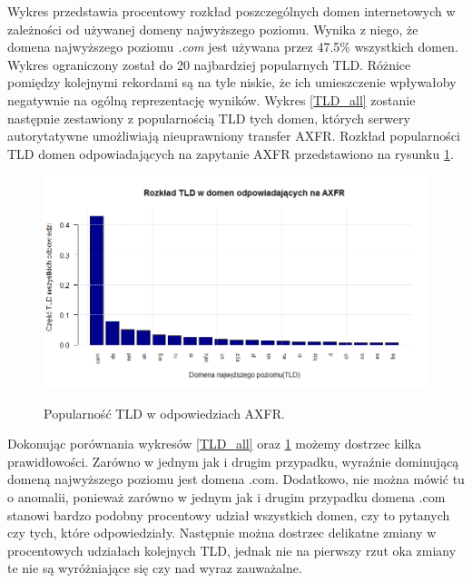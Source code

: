 Wykres przedstawia procentowy rozkład poszczególnych domen internetowych w zależności od używanej domeny najwyższego poziomu. Wynika z niego, że domena najwyższego poziomu \textit{.com} jest używana przez 47.5\% wszystkich domen. Wykres ograniczony został do 20 najbardziej popularnych TLD. Różnice pomiędzy kolejnymi rekordami są na tyle niskie, że ich umieszczenie wpływałoby negatywnie na ogólną reprezentację wyników. Wykres \ref{TLD_all} zostanie następnie zestawiony z popularnością TLD tych domen, których serwery autorytatywne umożliwiają nieuprawniony transfer AXFR. Rozkład popularności TLD domen odpowiadających na zapytanie AXFR przedstawiono na rysunku \ref{resp}.
\begin{center}
	\begin{figure}
		\includegraphics[width=1.0\textwidth]{image/resp}\label{resp}
		\caption{Popularność TLD w odpowiedziach AXFR.}
	\end{figure}
\end{center} 

Dokonując porównania wykresów \ref{TLD_all} oraz \ref{resp} możemy dostrzec kilka prawidłowości. Zarówno w jednym jak i drugim przypadku, wyraźnie dominującą domeną najwyższego poziomu jest domena .com. Dodatkowo, nie można mówić tu o anomalii, ponieważ zarówno w jednym jak i drugim przypadku domena .com stanowi bardzo podobny procentowy udział wszystkich domen, czy to pytanych czy tych, które odpowiedziały. Następnie można dostrzec delikatne zmiany w procentowych udziałach kolejnych TLD, jednak nie na pierwszy rzut oka zmiany te nie są wyróżniające się czy nad wyraz zauważalne.

